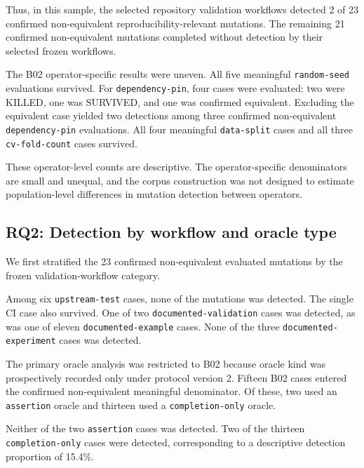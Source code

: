 Thus, in this sample, the selected repository validation workflows detected
2 of 23 confirmed non-equivalent reproducibility-relevant mutations. The
remaining 21 confirmed non-equivalent mutations completed without detection
by their selected frozen workflows.

The B02 operator-specific results were uneven. All five meaningful
\texttt{random-seed} evaluations survived. For \texttt{dependency-pin},
four cases were evaluated: two were KILLED, one was SURVIVED, and one was
confirmed equivalent. Excluding the equivalent case yielded two detections
among three confirmed non-equivalent \texttt{dependency-pin} evaluations.
All four meaningful \texttt{data-split} cases and all three
\texttt{cv-fold-count} cases survived.



These operator-level counts are descriptive. The operator-specific
denominators are small and unequal, and the corpus construction was not
designed to estimate population-level differences in mutation detection
between operators.


\FloatBarrier

\subsection{RQ2: Detection by workflow and oracle type}
\label{sec:results-rq2}

We first stratified the 23 confirmed non-equivalent evaluated mutations by the
frozen validation-workflow category.

Among six \texttt{upstream-test} cases, none of the mutations was detected.
The single CI case also survived. One of two
\texttt{documented-validation} cases was detected, as was one of eleven
\texttt{documented-example} cases. None of the three
\texttt{documented-experiment} cases was detected.



The primary oracle analysis was restricted to B02 because oracle kind was
prospectively recorded only under protocol version 2. Fifteen B02 cases
entered the confirmed non-equivalent meaningful denominator. Of these, two
used an \texttt{assertion} oracle and thirteen used a
\texttt{completion-only} oracle.

Neither of the two \texttt{assertion} cases was detected. Two of the thirteen
\texttt{completion-only} cases were detected, corresponding to a descriptive
detection proportion of 15.4\%.

